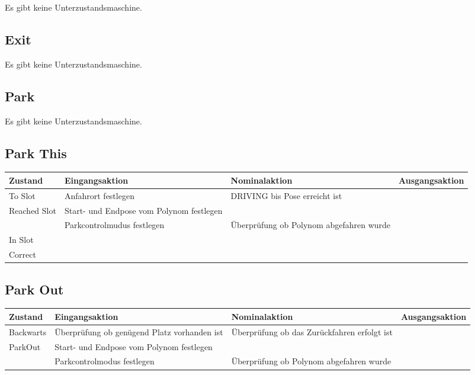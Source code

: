 Es gibt keine Unterzustandsmaschine.

\subsection{Exit}

Es gibt keine Unterzustandsmaschine.

\subsection{Park}

Es gibt keine Unterzustandsmaschine.

\subsection{Park This}

\begin{tabular}{|p{1.5cm}|p{4cm}|p{4cm}|p{3cm}|}
	\hline 
	Zustand & Eingangsaktion & Nominalaktion & Ausgangsaktion \\ 
	\hline 
	To Slot & Anfahrort festlegen & DRIVING bis Pose erreicht ist &  \\ 
	\hline 
	Reached Slot & Start- und Endpose vom Polynom festlegen &  &  \\ 
	\hline 
	 & Parkcontrolmudus festlegen & Überprüfung ob Polynom abgefahren wurde &  \\ 
	\hline
	In Slot &  &  &  \\ 
	\hline 
	Correct &  &  &  \\ 
	\hline
\end{tabular} 

\subsection{Park Out}

\begin{tabular}{|p{1.7cm}|p{4cm}|p{4cm}|p{3cm}|}
	\hline 
	Zustand & Eingangsaktion & Nominalaktion & Ausgangsaktion \\ 
	\hline 
	Backwarts & Überprüfung ob genügend Platz vorhanden ist & Überprüfung ob das Zurückfahren erfolgt ist &  \\ 
	\hline 
	ParkOut & Start- und Endpose vom Polynom festlegen  &  &  \\ 
	\hline  
	& Parkcontrolmodus festlegen & Überprüfung ob Polynom abgefahren wurde &  \\ 
	\hline
 
\end{tabular} 